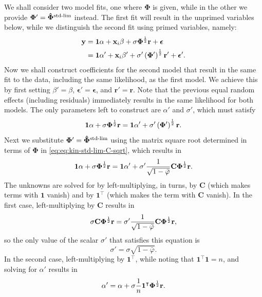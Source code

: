 \documentclass[11pt]{article}
\newcommand{\kinMat}{%
  \ensuremath{%
    \mathbf{\Phi}
  }%
  \xspace%
}%
\newcommand{\kinMatStdLim}{%
  \ensuremath{%
    \mathbf{\hat{\Phi}}^\text{std-lim}
  }%
  \xspace%
}%
\begin{document}
We shall consider two model fits, one where \kinMat is given, while in the other we provide $\kinMat' = \kinMatStdLim$ instead.
The first fit will result in the unprimed variables below, while we distinguish the second fit using primed variables, namely:
\begin{align*}
  \mathbf{y}
  &=
    \mathbf{1} \alpha + \mathbf{x}_i \beta + \sigma \kinMat^\frac{1}{2} \mathbf{r} + \boldsymbol{\epsilon}
  \\
  &=
    \mathbf{1} \alpha' + \mathbf{x}_i \beta' + \sigma' \left( \kinMat' \right)^\frac{1}{2} \mathbf{r}' + \boldsymbol{\epsilon}'
    .
\end{align*}
Now we shall construct coefficients for the second model that result in the same fit to the data, including the same likelihood, as the first model.
We achieve this by first setting
$\beta' = \beta$,
$\boldsymbol{\epsilon}' = \boldsymbol{\epsilon}$,
and
$\mathbf{r}' = \mathbf{r}$.
Note that the previous equal random effects (including residuals) immediately results in the same likelihood for both models.
The only parameters left to construct are $\alpha'$ and $\sigma'$, which must satisfy
$$
\mathbf{1} \alpha  + \sigma \kinMat^\frac{1}{2} \mathbf{r}
=
\mathbf{1} \alpha' + \sigma' \left( \kinMat' \right)^\frac{1}{2} \mathbf{r}
.
$$
Next we substitute $\kinMat' = \kinMatStdLim$ using the matrix square root determined in terms of \kinMat in \cref{eq:eq:kin-std-lim-C-sqrt}, which results in
$$
\mathbf{1} \alpha  + \sigma \kinMat^\frac{1}{2} \mathbf{r}
=
\mathbf{1} \alpha' + \sigma'
\frac{1}{ \sqrt{ 1 - \bar{\varphi} } }
\mathbf{C} \kinMat^\frac{1}{2}
\mathbf{r}
.
$$
The unknowns are solved for by left-multiplying, in turns, by $\mathbf{C}$ (which makes terms with $\mathbf{1}$ vanish) and by $\mathbf{1}^\intercal$ (which makes the term with $\mathbf{C}$ vanish).
In the first case, left-multiplying by $\mathbf{C}$ results in
$$
\sigma \mathbf{C} \kinMat^\frac{1}{2} \mathbf{r}
=
\sigma'
\frac{1}{ \sqrt{ 1 - \bar{\varphi} } }
\mathbf{C} \kinMat^\frac{1}{2}
\mathbf{r}
,
$$
so the only value of the scalar $\sigma'$ that satisfies this equation is
$$
\sigma'
=
\sigma \sqrt{ 1 - \bar{\varphi} }
.
$$
In the second case, left-multiplying by $\mathbf{1}^\intercal$, while noting that $\mathbf{1}^\intercal \mathbf{1} = n$, and solving for $\alpha'$ results in
$$
\alpha'
=
\alpha  + \sigma \frac{1}{n} \mathbf{1}^\intercal \kinMat^\frac{1}{2} \mathbf{r}
.
$$
\end{document}
